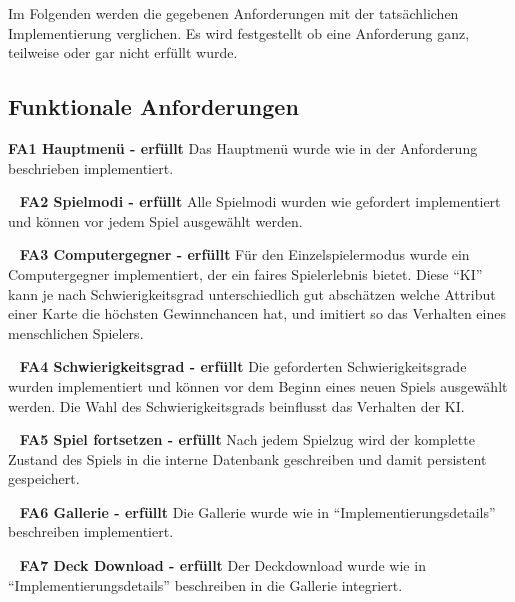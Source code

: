 \documentclass{scrartcl}
\begin{document}
Im Folgenden werden die gegebenen Anforderungen mit der tatsächlichen
Implementierung verglichen. Es wird festgestellt ob eine Anforderung ganz,
teilweise oder gar nicht erfüllt wurde.

\subsection{Funktionale Anforderungen}

\textbf{FA1 Hauptmenü - erfüllt} \newline
Das Hauptmenü wurde wie in der Anforderung beschrieben implementiert.

\ \newline
\textbf{FA2 Spielmodi - erfüllt} \newline
Alle Spielmodi wurden wie gefordert implementiert und können vor jedem Spiel
ausgewählt werden.

\ \newline
\textbf{FA3 Computergegner - erfüllt} \newline
Für den Einzelspielermodus wurde ein Computergegner implementiert, der ein
faires Spielerlebnis bietet. Diese \enquote{KI} kann je nach Schwierigkeitsgrad
unterschiedlich gut abschätzen welche Attribut einer Karte die höchsten
Gewinnchancen hat, und imitiert so das Verhalten eines menschlichen Spielers.

\ \newline
\textbf{FA4 Schwierigkeitsgrad - erfüllt} \newline
Die geforderten Schwierigkeitsgrade wurden implementiert und können vor dem
Beginn eines neuen Spiels ausgewählt werden. Die Wahl des Schwierigkeitsgrads
beinflusst das Verhalten der KI.

\ \newline
\textbf{FA5 Spiel fortsetzen - erfüllt} \newline
Nach jedem Spielzug wird der komplette Zustand des Spiels in die interne
Datenbank geschreiben und damit persistent gespeichert.

\ \newline
\textbf{FA6 Gallerie - erfüllt} \newline
Die Gallerie wurde wie in \enquote{Implementierungsdetails} beschreiben
implementiert.

\ \newline
\textbf{FA7 Deck Download - erfüllt} \newline
Der Deckdownload wurde wie in \enquote{Implementierungsdetails} beschreiben in
die Gallerie integriert.
\end{document}
